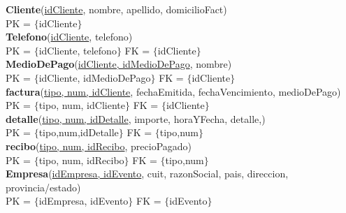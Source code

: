\textbf{Cliente}(\underline{idCliente}, nombre, apellido, domicilioFact)\\
PK =  $\lbrace$idCliente$\rbrace$  \\
\textbf{Telefono}(\underline{idCliente}, telefono)\\
PK = $\lbrace$idCliente, telefono$\rbrace$ FK = $\lbrace$idCliente$\rbrace$\\
\textbf{MedioDePago}(\underline{idCliente, idMedioDePago}, nombre)\\
PK = $\lbrace$idCliente, idMedioDePago$\rbrace$ FK = $\lbrace$idCliente$\rbrace$\\
\textbf{factura}(\underline{tipo, num, idCliente}, fechaEmitida, fechaVencimiento, medioDePago)\\
PK = $\lbrace$tipo, num, idCliente$\rbrace$ FK = $\lbrace$idCliente$\rbrace$\\
\textbf{detalle}(\underline{tipo, num, idDetalle}, importe, horaYFecha, detalle,)\\
PK = $\lbrace$tipo,num,idDetalle$\rbrace$ FK = $\lbrace$tipo,num$\rbrace$\\
\textbf{recibo}(\underline{tipo, num, idRecibo}, precioPagado)\\
PK = $\lbrace$tipo, num, idRecibo$\rbrace$ FK = $\lbrace$tipo,num$\rbrace$\\
\textbf{Empresa}(\underline{idEmpresa, idEvento}, cuit, razonSocial, pais, direccion, provincia/estado)\\
PK = $\lbrace$idEmpresa, idEvento$\rbrace$ FK = $\lbrace$idEvento$\rbrace$\\
